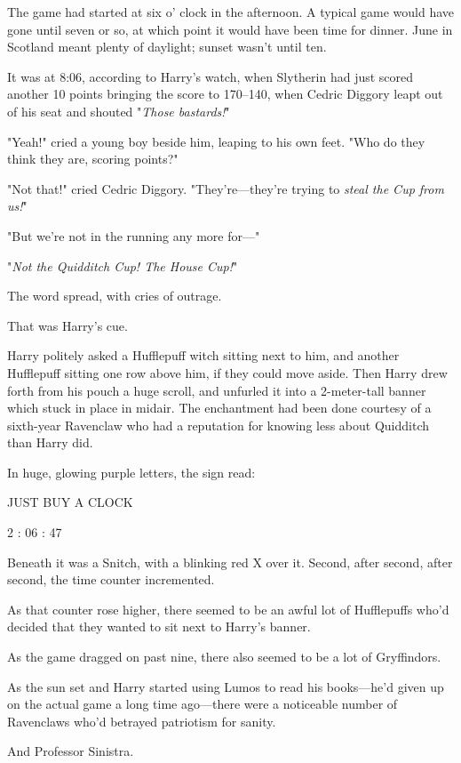 The game had started at six o' clock in the afternoon. A typical game would
have gone until seven or so, at which point it would have been time for dinner.
June in Scotland meant plenty of daylight; sunset wasn't until ten.

It was at 8:06\PM , according to Harry's watch, when Slytherin
had just scored another 10 points bringing the score to 170--{140}, when Cedric
Diggory leapt out of his seat and shouted "\emph{Those bastards!}"

"Yeah!" cried a young boy beside him, leaping to his own feet. "Who do they
think they are, scoring points?"

"Not that!" cried Cedric Diggory. "They're—they're trying to \emph{steal the
Cup from us!}"

"But we're not in the running any more for—"

"\emph{Not the Quidditch Cup! The House Cup!}"

The word spread, with cries of outrage.

That was Harry's cue.

Harry politely asked a Hufflepuff witch sitting next to him, and another
Hufflepuff sitting one row above him, if they could move aside. Then Harry drew
forth from his pouch a huge scroll, and unfurled it into a 2-meter-tall banner
which stuck in place in midair. The enchantment had been done courtesy of a
sixth-year Ravenclaw who had a reputation for knowing less about Quidditch than
Harry did.

In huge, glowing purple letters, the sign read:

\begin{center}
JUST BUY A CLOCK

2 : 06 : 47
\end{center}

Beneath it was a Snitch, with a blinking red X over it.
\sbreak
Second, after second, after second, the time counter incremented.

As that counter rose higher, there seemed to be an awful lot of Hufflepuffs
who'd decided that they wanted to sit next to Harry's banner.

As the game dragged on past nine, there also seemed to be a lot of Gryffindors.

As the sun set and Harry started using Lumos to read his books—he'd given up
on the actual game a long time ago—there were a noticeable number of
Ravenclaws who'd betrayed patriotism for sanity.

And Professor Sinistra.

